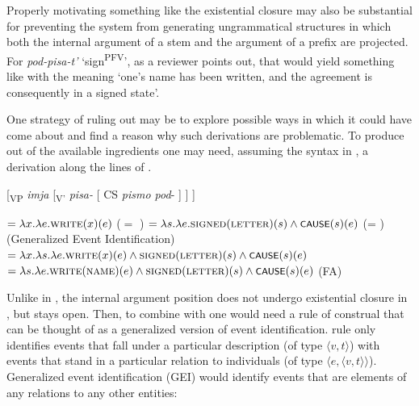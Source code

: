 \documentclass[output=paper,colorlinks,citecolor=brown]{langscibook}
\begin{document}
Properly motivating something like the existential closure may also be substantial for preventing the system from generating ungrammatical structures in which both the internal argument of a stem  and the argument of a prefix are projected. For \textit{pod-pisa-t’} ‘sign\textsuperscript{PFV}’, as a reviewer points out, that would yield something like  with the meaning ‘one’s name has been written, and the agreement is consequently in a signed state’.

\z

\noindent One strategy of ruling  out may be to explore possible ways in which it  could have come about and find a reason why such derivations are problematic. To produce  out of the available ingredients one may need, assuming the syntax in , a derivation along the lines of .

\ea{}   [\textsubscript{VP}  \textit{imja}  [\textsubscript{V'} \textit{pisa-} [  CS \textit{pismo pod}- ] ]  ]\label{ex:tatevosov:92}
\z

\ea\label{ex:tatevosov:93}
\ea {} $= \lambda x.\lambda e. \textsc{write}(x)(e)$           \hfill($=$ )\label{ex:tatevosov:93a}
\ex    {} $= \lambda s.\lambda e. \textsc{signed}(\textsc{letter})(s) \wedge \cnst{cause}(s)(e)$  \hfill (= )\label{ex:tatevosov:93b}
\ex    {} \hfill (Generalized Event                       Identification)\label{ex:tatevosov:93c}\\$= \lambda x. \lambda s.\lambda e.\textsc{write}(x)(e) \wedge \textsc{signed}(\textsc{letter})(s) \wedge \cnst{cause}(s)(e)$
\ex    {} $= \lambda s.\lambda e.\textsc{write}(\textsc{name})(e) \wedge \textsc{signed}(\textsc{letter})(s) \wedge \cnst{cause}(s)(e)$ \hfill (FA)\label{ex:tatevosov:93d}
\z
\z

\noindent Unlike in , the internal argument position does not undergo existential closure in , but stays open. Then, to combine  with  one would need a rule of construal that can be thought of as a generalized version of event identification.  rule only identifies events that fall under a particular description (of type $\langle v, t \rangle$) with events that stand in a particular relation to individuals (of type $\langle e, \langle v, t \rangle\rangle$). Generalized event identification (GEI) would identify events that are elements of any relations to any other entities:
\end{document}

